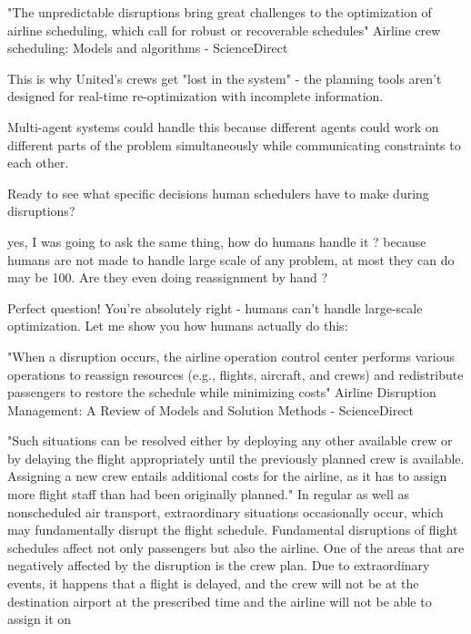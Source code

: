  "The unpredictable disruptions bring great challenges to the optimization of airline scheduling, which call for robust or recoverable schedules" 
Airline crew scheduling: Models and algorithms - ScienceDirect

This is why United's crews get "lost in the system" - the planning tools aren't designed for real-time re-optimization with incomplete information.

 Multi-agent systems could handle this because different agents could work on different parts of the problem simultaneously while communicating constraints to each other.

Ready to see what specific decisions human schedulers have to make during disruptions?


yes, I was going to ask the same thing, how do humans handle it ? because humans are not made to handle large scale of any problem, at most they can do may be 100. Are they even doing reassignment by hand ?


Perfect question! You're absolutely right - humans can't handle large-scale optimization. Let me show you 
 how humans actually do this:


"When a disruption occurs, the airline operation control center performs various operations to reassign resources (e.g., flights, aircraft, and crews) and redistribute passengers to restore the schedule while minimizing costs" 
Airline Disruption Management: A Review of Models and Solution Methods - ScienceDirect

 "Such situations can be resolved either by deploying any other available crew or by delaying the flight appropriately until the previously planned crew is available. Assigning a new crew entails additional costs for the airline, as it has to assign more flight staff than had been originally planned." 
In regular as well as nonscheduled air transport, extraordinary situations occasionally occur, which may fundamentally disrupt the flight schedule. Fundamental disruptions of flight schedules affect not only passengers but also the airline. One of the areas that are negatively affected by the disruption is the crew plan. Due to extraordinary events, it happens that a flight is delayed, and the crew will not be at the destination airport at the prescribed time and the airline will not be able to assign it on

